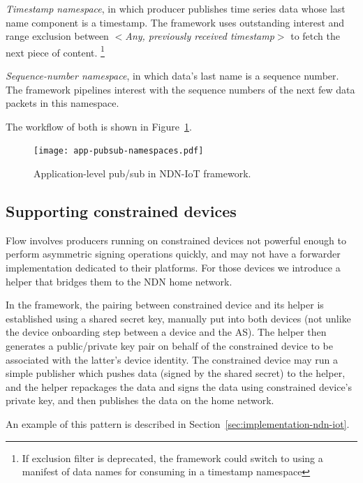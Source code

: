\emph{Timestamp namespace}, in which producer publishes time series data whose last name component is a timestamp. 
The framework uses outstanding interest and range exclusion between $<$\emph{Any, previously received timestamp}$>$ to fetch the next piece of content.
\footnote{If exclusion filter is deprecated, the framework could switch to using a manifest of data names for consuming in a timestamp namespace}

\emph{Sequence-number namespace}, in which data's last name is a sequence number. 
The framework pipelines interest with the sequence numbers of the next few data packets in this namespace.

The workflow of both is shown in Figure~\ref{fig:application-level-pub-sub}.

\begin{figure}[!t]
\centering
\texttt{[image: app-pubsub-namespaces.pdf]}
\caption{Application-level pub/sub in NDN-IoT framework.}
\label{fig:application-level-pub-sub}
\end{figure}

\subsection{Supporting constrained devices}
\label{sec:constrained-device}

Flow involves producers running on constrained devices not powerful enough to perform asymmetric signing operations quickly, and may not have a forwarder implementation dedicated to their platforms. 
For those devices we introduce a helper that bridges them to the NDN home network.

In the framework, the pairing between constrained device and its helper is established using a shared secret key, manually put into both devices (not unlike the device onboarding step between a device and the AS).
The helper then generates a public/private key pair on behalf of the constrained device to be associated with the latter's device identity.
The constrained device may run a simple publisher which pushes data (signed by the shared secret) to the helper, and the helper repackages the data and signs the data using constrained device's private key, and then publishes the data on the home network.

An example of this pattern is described in Section~\ref{sec:implementation-ndn-iot}.


